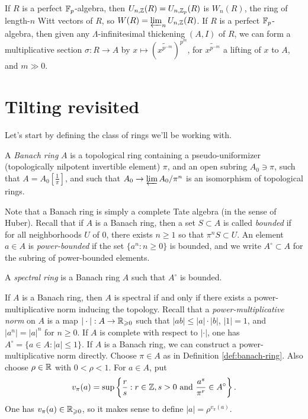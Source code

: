 \documentclass{article}
\begin{document}
If $R$ is a perfect $\mathbb{F}_p$-algebra, then $U_{n,\mathbb{Z}}(R)=U_{n,\mathbb{Z}_p}(R)$ is 
$W_n(R)$, the ring of length-$n$ Witt vectors of $R$, so 
$W(R) = \varprojlim_n U_{n,\mathbb{Z}}(R)$. If $R$ is a perfect $\mathbb{F}_p$-algebra, then 
given any $\Lambda$-infinitesimal thickening $(A,I)$ of $R$, we can form a 
multiplicative section $\sigma:R\to A$ by 
$x\mapsto (\widetilde{x^{p^{-m}}})^{p^m}$, for $\widetilde{x^{p^{-m}}}$ a lifting 
of $x$ to $A$, and $m\gg 0$. 





\section{Tilting revisited}

Let's start by defining the class of rings we'll be working with. 

\begin{definition}\label{def:banach-ring}
A \emph{Banach ring} $A$ is a topological ring containing a pseudo-uniformizer 
(topologically nilpotent invertible element) $\pi$, and an open subring 
$A_0\ni \pi$, such that 
$A = A_0[\frac 1 \pi]$, and such that $A_0 \to \varprojlim A_0/\pi^n$ is an 
isomorphism of topological rings.  
\end{definition}

Note that a Banach ring is simply a complete Tate algebra (in the sense of 
Huber). Recall that if $A$ is a Banach ring, then a set $S\subset A$ is called 
\emph{bounded} if for all neighborhoods $U$ of $0$, there exists 
$n\geqslant 1$ so that $\pi^n S\subset U$. An element $a\in A$ is 
\emph{power-bounded} if the set $\{a^n:n\geqslant 0\}$ is bounded, and we 
write $A^\circ\subset A$ for the subring of power-bounded elements. 

\begin{definition}
A \emph{spectral ring} is a Banach ring $A$ such that $A^\circ$ is bounded. 
\end{definition}

If $A$ is a Banach ring, then $A$ is spectral if and only if there exists a 
power-multiplicative norm inducing the topology. Recall that a 
\emph{power-multiplicative norm} on $A$ is a map 
$|\cdot|:A\to \mathbb{R}_{\geqslant 0}$ such that $|a b|\leqslant |a|\cdot |b|$, 
$|1|=1$, and $|a^n|=|a|^n$ for $n\geqslant 0$. If $A$ is complete with 
respect to $|\cdot|$, one has $A^\circ = \{a\in A:|a|\leqslant 1\}$. If $A$ is 
a Banach ring, we can construct a power-multiplicative norm directly. Choose 
$\pi\in A$ as in Definition \ref{def:banach-ring}. Also choose $\rho\in \mathbb{R}$ 
with $0<\rho<1$. For $a\in A$, put 
\[
  v_\pi(a) = \sup\left\{\frac r s :  r\in \mathbb{Z},s>0\text{ and }\frac{a^s}{\pi^r}\in A^\circ\right\} .
\]
One has $v_\pi(a)\in \mathbb{R}_{\geqslant 0}$, so it makes sense to define 
$|a| = \rho^{v_\pi(a)}$. 
\end{document}
